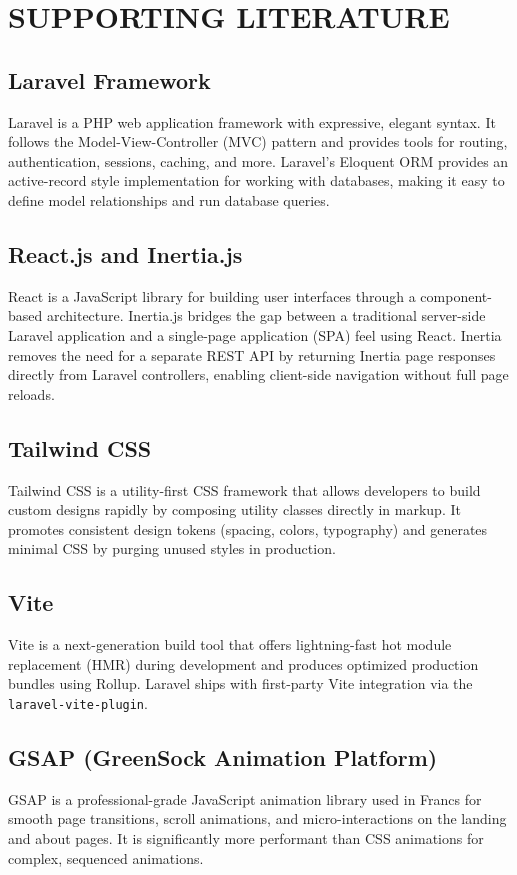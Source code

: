 \chapter{SUPPORTING LITERATURE}

\section{Laravel Framework}
Laravel is a PHP web application framework with expressive, elegant syntax. It follows the Model-View-Controller (MVC) pattern and provides tools for routing, authentication, sessions, caching, and more. Laravel's Eloquent ORM provides an active-record style implementation for working with databases, making it easy to define model relationships and run database queries.

\section{React.js and Inertia.js}
React is a JavaScript library for building user interfaces through a component-based architecture. Inertia.js bridges the gap between a traditional server-side Laravel application and a single-page application (SPA) feel using React. Inertia removes the need for a separate REST API by returning Inertia page responses directly from Laravel controllers, enabling client-side navigation without full page reloads.

\section{Tailwind CSS}
Tailwind CSS is a utility-first CSS framework that allows developers to build custom designs rapidly by composing utility classes directly in markup. It promotes consistent design tokens (spacing, colors, typography) and generates minimal CSS by purging unused styles in production.

\section{Vite}
Vite is a next-generation build tool that offers lightning-fast hot module replacement (HMR) during development and produces optimized production bundles using Rollup. Laravel ships with first-party Vite integration via the \texttt{laravel-vite-plugin}.

\section{GSAP (GreenSock Animation Platform)}
GSAP is a professional-grade JavaScript animation library used in Francs for smooth page transitions, scroll animations, and micro-interactions on the landing and about pages. It is significantly more performant than CSS animations for complex, sequenced animations.

